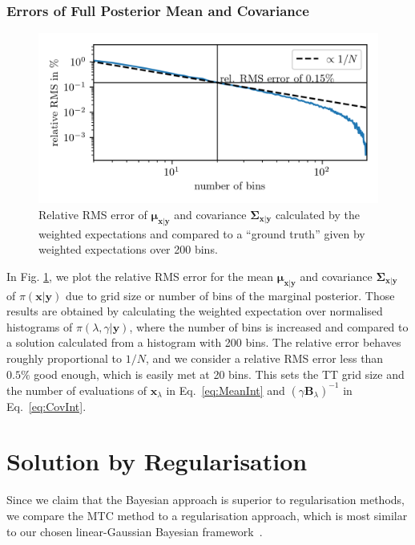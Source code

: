 \subsubsection{Errors of Full Posterior Mean and Covariance}
\begin{figure}[ht!]
	\centering
	\includegraphics{relErrO3MeanVar.png}
	\caption[Relative Error of full posterior mean and covariance.]{Relative RMS error of $\bm{\mu}_{\bm{x}|\bm{y}}$ and covariance $\bm{\Sigma}_{\bm{x}|\bm{y}}$ calculated by the weighted expectations and compared to a ``ground truth'' given by weighted expectations over 200 bins.}
	\label{fig:MeanVarError}
\end{figure}
In Fig. \ref{fig:MeanVarError}, we plot the relative RMS error for the mean $\bm{\mu}_{\bm{x}|\bm{y}}$ and covariance $\bm{\Sigma}_{\bm{x}|\bm{y}}$ of $\pi(\bm{x}|\bm{y})$ due to grid size or number of bins of the marginal posterior.
Those results are obtained by calculating the weighted expectation over normalised histograms of $\pi(\lambda,\gamma | \bm{y})$, where the number of bins is increased and compared to a solution calculated from a histogram with 200 bins.
The relative error behaves roughly proportional to $1/N$, and we consider a relative RMS error less than $0.5\%$ good enough, which is easily met at 20 bins.
This sets the TT grid size and the number of evaluations of $\bm{x}_{\lambda}$ in Eq.~\ref{eq:MeanInt} and $(\gamma \bm{B}_{\lambda})^{-1}$ in Eq.~\ref{eq:CovInt}.


\section{Solution by Regularisation}
\label{sec:SolByReg}
Since we claim that the Bayesian approach is superior to regularisation methods, we compare the MTC method to a regularisation approach, which is most similar to our chosen linear-Gaussian Bayesian framework~\cite{fox2016fast}.

